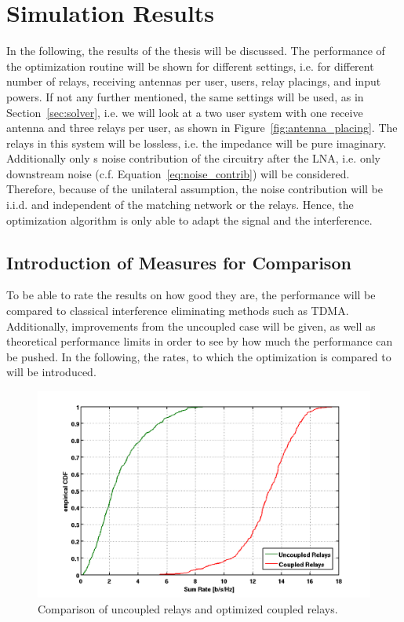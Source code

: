 \chapter{Simulation Results}
\label{sec:results}

In the following, the results of the thesis will be discussed.
The performance of the optimization routine will be shown for different settings, i.e. for different number of relays, receiving antennas per user, users, relay placings, and input powers.
If not any further mentioned, the same settings will be used, as in Section~\ref{sec:solver}, i.e.
we will look at a two user system with one receive antenna and three relays per user, as shown in Figure~\ref{fig:antenna_placing}.
The relays in this system will be lossless, i.e. the impedance will be pure imaginary.
Additionally only s noise contribution of the circuitry after the LNA, i.e. only downstream noise (c.f. Equation~\eqref{eq:noise_contrib}) will be considered.
Therefore, because of the unilateral assumption, the noise contribution will be i.i.d. and independent of the matching network or the relays.
Hence, the optimization algorithm is only able to adapt the signal and the interference.

\section{Introduction of Measures for Comparison}
\label{sec:measures}
To be able to rate the results on how good they are, the performance will be compared to classical interference eliminating methods such as TDMA.
Additionally, improvements from the uncoupled case will be given, as well as theoretical performance limits in order to see by how much the performance can be pushed.
In the following, the rates, to which the optimization is compared to will be introduced.
\begin{figure}[h]
\centering
  \includegraphics[width=0.85\linewidth]{images/Coupledcomparison.png}
\caption{Comparison of uncoupled relays and optimized coupled relays.}
\label{fig:coupledcomparison}
\end{figure}

